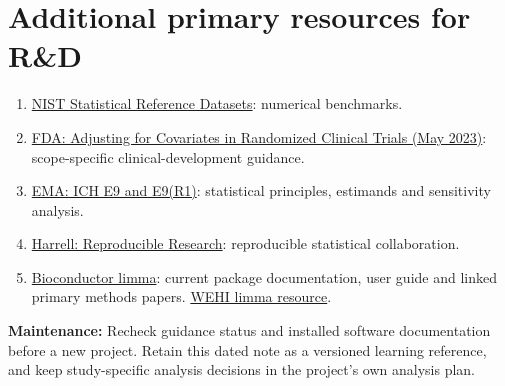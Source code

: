 \documentclass[11pt]{article}
\begin{document}
\section{Additional primary resources for R\&D}
\begin{enumerate}
\item \href{https://www.nist.gov/itl/sed/statistical-reference-datasets}{NIST Statistical Reference Datasets}: numerical benchmarks.
\item \href{https://www.fda.gov/regulatory-information/search-fda-guidance-documents/adjusting-covariates-randomized-clinical-trials-drugs-and-biological-products}{FDA: Adjusting for Covariates in Randomized Clinical Trials (May 2023)}: scope-specific clinical-development guidance.
\item \href{https://www.ema.europa.eu/en/scientific-guidelines/ich-e9-statistical-principles-clinical-trials}{EMA: ICH E9 and E9(R1)}: statistical principles, estimands and sensitivity analysis.
\item \href{https://hbiostat.org/rr/}{Harrell: Reproducible Research}: reproducible statistical collaboration.
\item \href{https://www.bioconductor.org/packages/release/bioc/html/limma}{Bioconductor limma}: current package documentation, user guide and linked primary methods papers. \href{https://bioinf.wehi.edu.au/limma/}{WEHI limma resource}.
\end{enumerate}
\textbf{Maintenance:} Recheck guidance status and installed software documentation before a new project. Retain this dated note as a versioned learning reference, and keep study-specific analysis decisions in the project's own analysis plan.
\end{document}
